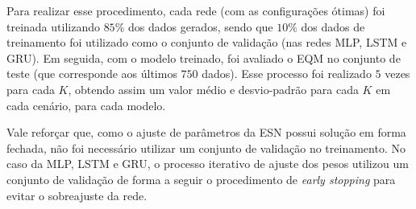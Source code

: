 \documentclass{article}
\begin{document}
Para realizar esse procedimento, cada rede (com as configurações ótimas) foi treinada utilizando $85\%$ dos dados gerados, sendo que $10\%$ dos dados de treinamento foi utilizado como o conjunto de validação (nas redes MLP, LSTM e GRU). Em seguida, com o modelo treinado, foi avaliado o EQM no conjunto de teste (que corresponde aos últimos $750$ dados). Esse processo foi realizado $5$ vezes para cada $K$, obtendo assim um valor médio e desvio-padrão para cada $K$ em cada cenário, para cada modelo.

Vale reforçar que, como o ajuste de parâmetros da ESN possui solução em forma fechada, não foi necessário utilizar um conjunto de validação no treinamento. No caso da MLP, LSTM e GRU, o processo iterativo de ajuste dos pesos utilizou um conjunto de validação de forma a seguir o procedimento de \textit{early stopping} para evitar o sobreajuste da rede.
\end{document}
